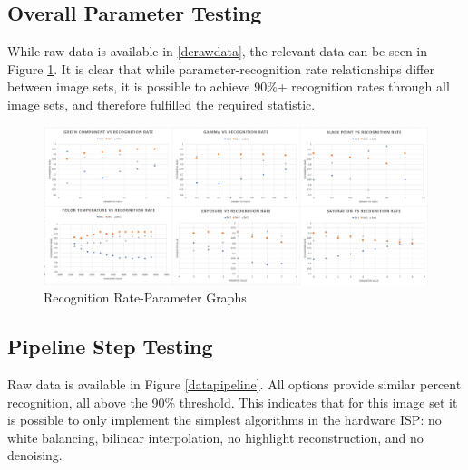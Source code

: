 \documentclass{report}
\begin{document}
	\subsection{Overall Parameter Testing}
	While raw data is available in \ref{dcrawdata}, the relevant data can be seen in Figure \ref{overallgraphs}. It is clear that while parameter-recognition rate relationships differ between image sets, it is possible to achieve 90\%+ recognition rates through all image sets, and therefore fulfilled the required statistic.
	
	\begin{figure}
		\begin{center}
			\label{overallgraphs}
			\caption{Recognition Rate-Parameter Graphs}
			\includegraphics[scale=0.5]{all_graphs.png}
		\end{center}
	\end{figure}
	
	
	
	\subsection{Pipeline Step Testing}
	Raw data is available in Figure \ref{datapipeline}. All options provide similar percent recognition, all above the 90\% threshold. This indicates that for this image set it is possible to only implement the simplest algorithms in the hardware ISP: no white balancing, bilinear interpolation, no highlight reconstruction, and no denoising.
	
\end{document}
